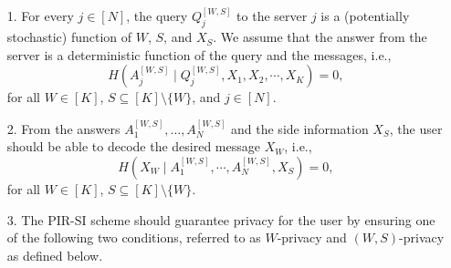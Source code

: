 \documentclass[letterpaper, 10 pt, conference]{ieeeconf}
\newcommand{\Xj}[1]{X_{#1}} %
\newcommand{\Q}[2]{Q^{[#1, #2]}} %
\newcommand{\A}[2]{A^{[#1,#2]}} %
\newcommand{\Hc}[2]{H\left(#1 \mid #2\right)} %
\newcommand{\I}[2]{I\left(#1\: ; \: #2\right)} %
\begin{document}
\begin{itemize}
	\item[1.]  For every $j\in[N]$, 
    the query $\Q{W}{S}_j$ to the server $j$ 
    is a (potentially stochastic) function of $W$, $S$, and $\Xj{S}$. We assume that the answer from the server
is a deterministic function of the query and the messages, i.e.,
\begin{equation}
\label{eq:answer}
\Hc{\A{W}{S}_j}{\Q{W}{S}_j,\Xj{1}, \Xj{2}, \cdots, \Xj{K}} = 0,
\end{equation} for all $W\in [K]$, $S\subseteq[K]\setminus\{W\}$, and $j\in[N]$. 

\item[2.] From the answers $A^{[W,S]}_1,\dots,A^{[W,S]}_N$ 
and the side information $X_S$, the user should be able to decode the desired message $X_W$, i.e.,
\begin{equation}
\label{eq:decodability}
\Hc{\Xj{W}}{\A{W}{S}_1, \cdots , \A{W}{S}_N ,\Xj{S}} = 0,
\end{equation} for all $W\in [K]$, $S\subseteq[K]\setminus\{W\}$.
 
\item[3.]  The PIR-SI scheme should guarantee privacy for the user by ensuring one of the following two  conditions, referred to as  $W$-privacy and $(W,S)$-privacy as defined below. %


\end{itemize}
\end{document}

